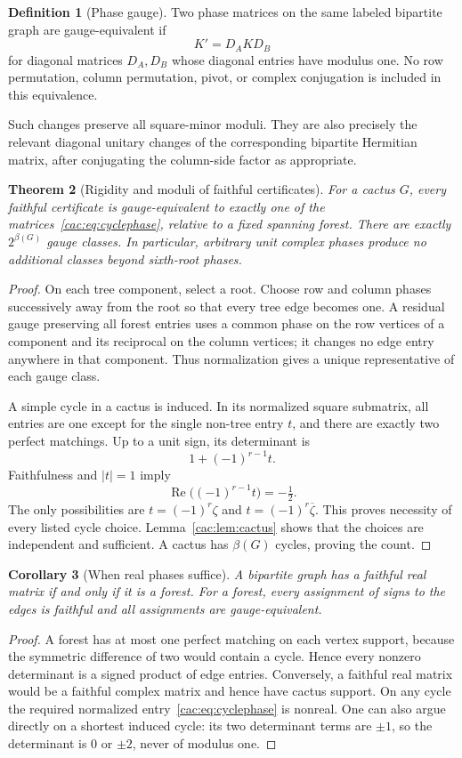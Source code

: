 \documentclass[11pt]{article}
\numberwithin{equation}{section}
\newtheorem{theorem}{Theorem}[section]
\newtheorem{corollary}[theorem]{Corollary}
\theoremstyle{definition}
\newtheorem{definition}[theorem]{Definition}
\begin{document}
\begin{definition}[Phase gauge]
Two phase matrices on the same labeled bipartite graph are gauge-equivalent if
\[
 K'=D_AKD_B
\]
for diagonal matrices $D_A,D_B$ whose diagonal entries have modulus one. No row permutation, column permutation, pivot, or complex conjugation is included in this equivalence.
\end{definition}
Such changes preserve all square-minor moduli. They are also precisely the relevant diagonal unitary changes of the corresponding bipartite Hermitian matrix, after conjugating the column-side factor as appropriate.

\begin{theorem}[Rigidity and moduli of faithful certificates]
\label{cac:thm:gauge}
For a cactus $G$, every faithful certificate is gauge-equivalent to exactly one of the matrices~\eqref{cac:eq:cyclephase}, relative to a fixed spanning forest. There are exactly $2^{\beta(G)}$ gauge classes. In particular, arbitrary unit complex phases produce no additional classes beyond sixth-root phases.
\end{theorem}
\begin{proof}
On each tree component, select a root. Choose row and column phases successively away from the root so that every tree edge becomes one. A residual gauge preserving all forest entries uses a common phase on the row vertices of a component and its reciprocal on the column vertices; it changes no edge entry anywhere in that component. Thus normalization gives a unique representative of each gauge class.

A simple cycle in a cactus is induced. In its normalized square submatrix, all entries are one except for the single non-tree entry $t$, and there are exactly two perfect matchings. Up to a unit sign, its determinant is
\[
 1+(-1)^{r-1}t.
\]
Faithfulness and $|t|=1$ imply
\[
 \operatorname{Re}\bigl((-1)^{r-1}t\bigr)=-\tfrac12.
\]
The only possibilities are $t=(-1)^r\zeta$ and $t=(-1)^r\overline\zeta$. This proves necessity of every listed cycle choice. Lemma~\ref{cac:lem:cactus} shows that the choices are independent and sufficient. A cactus has $\beta(G)$ cycles, proving the count.
\end{proof}

\begin{corollary}[When real phases suffice]
\label{cac:cor:real}
A bipartite graph has a faithful real matrix if and only if it is a forest. For a forest, every assignment of signs to the edges is faithful and all assignments are gauge-equivalent.
\end{corollary}
\begin{proof}
A forest has at most one perfect matching on each vertex support, because the symmetric difference of two would contain a cycle. Hence every nonzero determinant is a signed product of edge entries. Conversely, a faithful real matrix would be a faithful complex matrix and hence have cactus support. On any cycle the required normalized entry~\eqref{cac:eq:cyclephase} is nonreal. One can also argue directly on a shortest induced cycle: its two determinant terms are $\pm1$, so the determinant is $0$ or $\pm2$, never of modulus one.
\end{proof}
\end{document}

